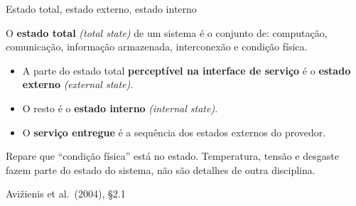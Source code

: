 \documentclass{beamer}
\newcommand{\en}[1]{{\color{depCinza}\textit{#1}}}
\newcommand{\sect}[1]{\par\smallskip\hfill{\tiny\color{black!55}Avi\v{z}ienis et al.\ (2004), #1}}
\begin{document}
\begin{frame}{Estado total, estado externo, estado interno}
    \footnotesize
    \begin{defi}
        \scriptsize
        O \textbf{estado total} \en{(total state)} de um sistema \'e o conjunto de: computa\c{c}\~ao, comunica\c{c}\~ao, informa\c{c}\~ao armazenada, interconex\~ao e condi\c{c}\~ao f\'isica.
    \end{defi}
    \medskip
    \begin{itemize}
        \item A parte do estado total \textbf{percept\'ivel na interface de servi\c{c}o} \'e o \textbf{estado externo} \en{(external state)}.
        \item O resto \'e o \textbf{estado interno} \en{(internal state)}.
        \item O \textbf{servi\c{c}o entregue} \'e a sequ\^encia dos estados externos do provedor.
    \end{itemize}
    \medskip
    \begin{ancora}
        \footnotesize
        Repare que ``condi\c{c}\~ao f\'isica'' est\'a no estado. Temperatura, tens\~ao e desgaste fazem parte do estado do sistema, n\~ao s\~ao detalhes de outra disciplina.
    \end{ancora}
    \sect{\S2.1}
\end{frame}
\end{document}
